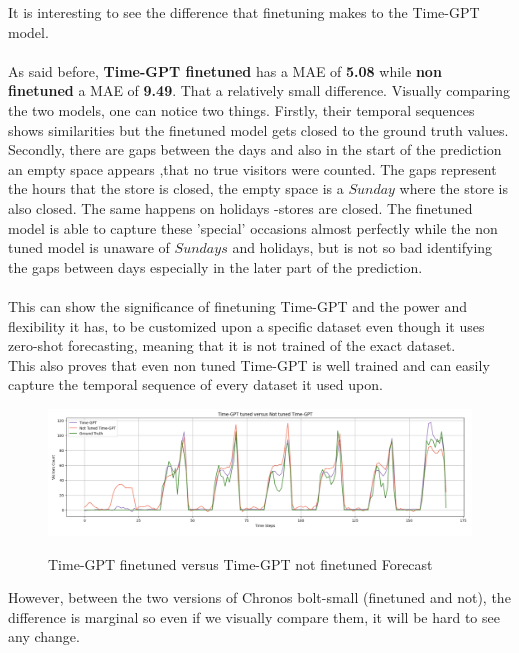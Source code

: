 \documentclass{article}
\begin{document}
It is interesting to see the difference that finetuning makes to the Time-GPT model.\\
\\
As said before, \textbf{Time-GPT finetuned} has a MAE of \textbf{5.08} while \textbf{non finetuned} a MAE of \textbf{9.49}. That a relatively small difference. Visually comparing the two models, one can notice two things. Firstly, their temporal sequences shows similarities but the finetuned model gets closed to the ground truth values. Secondly, there are gaps between the days and also in the start of the prediction an empty space appears ,that no true visitors were counted. The gaps represent the hours that the store is closed, the empty space is a $Sunday$ where the store is also closed. The same happens on holidays -stores are closed. The finetuned model is able to capture these 'special' occasions almost perfectly while the non tuned model is unaware of $Sundays$ and holidays, but is not so bad identifying the gaps between days especially in the later part of the prediction.\\
\\
This can show the significance of finetuning Time-GPT and the power and flexibility it has, to be customized upon a specific dataset even though it uses zero-shot forecasting, meaning that it is not trained of the exact dataset.\\
This also proves that even non tuned Time-GPT is well trained and can easily capture the temporal sequence of every dataset it used upon.

\begin{figure}[h]
\includegraphics[width=1\linewidth]{images/TimeGPT_Tuned_and_Not_Forecast.png}
    \label{fig:mesh1}
    \caption{Time-GPT finetuned versus Time-GPT not finetuned Forecast}
\end{figure}

However, between the two versions of Chronos bolt-small (finetuned and not), the difference is marginal so even if we visually compare them, it will be hard to see any change.\\
\\
\end{document}
